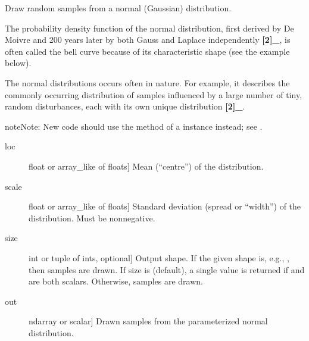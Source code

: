 \documentclass[letterpaper,10pt,english]{sphinxmanual}
\begin{document}
\begin{fulllineitems}
\label{\detokenize{infrapy.utils:infrapy.utils.ref2sac.normal}}
Draw random samples from a normal (Gaussian) distribution.

The probability density function of the normal distribution, first
derived by De Moivre and 200 years later by both Gauss and Laplace
independently {\color{red}\bfseries{}{[}2{]}\_}, is often called the bell curve because of
its characteristic shape (see the example below).

The normal distributions occurs often in nature.  For example, it
describes the commonly occurring distribution of samples influenced
by a large number of tiny, random disturbances, each with its own
unique distribution {\color{red}\bfseries{}{[}2{]}\_}.

\begin{sphinxadmonition}{note}{Note:}
New code should use the  method of a 
instance instead; see .
\end{sphinxadmonition}
\begin{description}
\item[{loc}] \leavevmode{[}float or array\_like of floats{]}
Mean (“centre”) of the distribution.

\item[{scale}] \leavevmode{[}float or array\_like of floats{]}
Standard deviation (spread or “width”) of the distribution. Must be
non\sphinxhyphen{}negative.

\item[{size}] \leavevmode{[}int or tuple of ints, optional{]}
Output shape.  If the given shape is, e.g., , then
 samples are drawn.  If size is  (default),
a single value is returned if  and  are both scalars.
Otherwise,  samples are drawn.

\end{description}
\begin{description}
\item[{out}] \leavevmode{[}ndarray or scalar{]}
Drawn samples from the parameterized normal distribution.


\end{description}
\end{fulllineitems}
\end{document}
